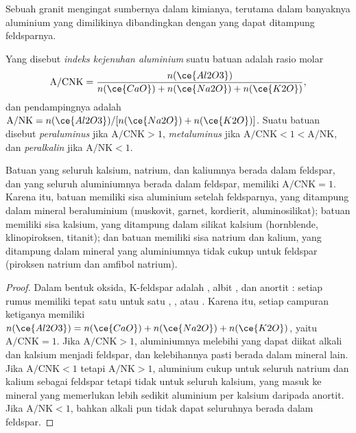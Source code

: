 Sebuah granit mengingat sumbernya dalam kimianya, terutama dalam banyaknya aluminium yang dimilikinya
dibandingkan dengan yang dapat ditampung feldsparnya.

\begin{definition}\label{def:b2:crustal-melting:asi}
Yang disebut \emph{indeks kejenuhan aluminium} suatu batuan adalah
rasio molar
\[\mathrm{A/CNK} = \frac{n(\ce{Al2O3})}{n(\ce{CaO}) + n(\ce{Na2O}) + n(\ce{K2O})},\]
dan pendampingnya adalah $\mathrm{A/NK} = n(\ce{Al2O3})/[n(\ce{Na2O}) + n(\ce{K2O})]$. Suatu batuan
disebut \emph{peraluminus} jika $\mathrm{A/CNK} > 1$,
\emph{metaluminus} jika $\mathrm{A/CNK} < 1 < \mathrm{A/NK}$, dan
\emph{peralkalin} jika $\mathrm{A/NK} < 1$.
\end{definition}

\begin{proposition}\label{prop:b2:crustal-melting:feldspar}
Batuan yang seluruh kalsium, natrium, dan kaliumnya berada dalam feldspar, dan yang seluruh aluminiumnya
berada dalam feldspar, memiliki $\mathrm{A/CNK} = 1$. Karena itu, batuan  memiliki sisa aluminium
setelah feldsparnya, yang ditampung dalam mineral beraluminium (muskovit, garnet, kordierit,
aluminosilikat); batuan  memiliki sisa kalsium, yang ditampung dalam silikat kalsium
(hornblende, klinopiroksen, titanit); dan batuan  memiliki sisa natrium dan kalium,
yang ditampung dalam mineral yang aluminiumnya tidak cukup untuk feldspar (piroksen natrium dan
amfibol natrium).
\end{proposition}

\begin{proof}
Dalam bentuk oksida, K-feldspar adalah , albit , dan
anortit : setiap rumus memiliki tepat satu  untuk satu
, , atau . Karena itu, setiap campuran ketiganya memiliki $n(\ce{Al2O3}) =
n(\ce{CaO}) + n(\ce{Na2O}) + n(\ce{K2O})$, yaitu $\mathrm{A/CNK} = 1$. Jika
$\mathrm{A/CNK} > 1$, aluminiumnya melebihi yang dapat diikat alkali dan kalsium menjadi
feldspar, dan kelebihannya pasti berada dalam mineral lain. Jika $\mathrm{A/CNK} < 1$ tetapi
$\mathrm{A/NK} > 1$, aluminium cukup untuk seluruh natrium dan kalium sebagai
feldspar tetapi tidak untuk seluruh kalsium, yang masuk ke mineral yang memerlukan lebih sedikit aluminium
per kalsium daripada anortit. Jika $\mathrm{A/NK} < 1$, bahkan alkali pun tidak dapat seluruhnya berada dalam
feldspar.
\end{proof}

